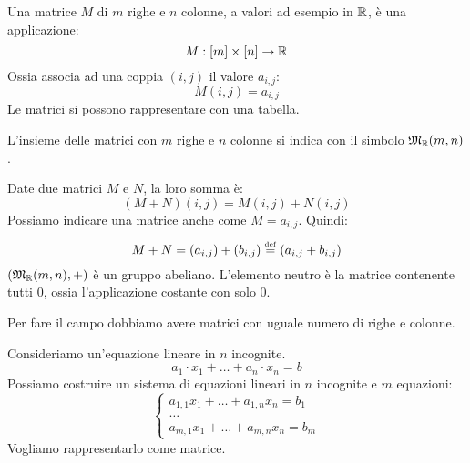 \begin{defn}
Una matrice $M$ di $m$ righe e $n$ colonne, a valori ad esempio in $\mathbb{R}$, \`e una applicazione:
\[
M : [m] \times [n] \to \mathbb{R}
\]
Ossia associa ad una coppia $(i, j)$ il valore $a_{i, j}$:
\[
M(i, j) = a_{i, j}
\]
Le matrici si possono rappresentare con una tabella.
\end{defn}

L'insieme delle matrici con $m$ righe e $n$ colonne si indica con il simbolo $\mathfrak{M}_{\mathbb{R}}(m,n)$.

Date due matrici $M$ e $N$, la loro somma \`e:
\[
(M + N) (i, j) = M(i, j) + N(i, j)
\]
Possiamo indicare una matrice anche come $M = a_{i, j}$. Quindi:
\[
M + N = (a_{i, j}) + (b_{i, j}) \overset{\underset{\mathrm{def}}{}}{=} (a_{i, j} + b_{i, j})
\]
$(\mathfrak{M}_{\mathbb{R}}(m,n), +)$ \`e un gruppo abeliano. L'elemento neutro \`e la matrice contenente tutti 0, ossia l'applicazione costante con solo 0.

Per fare il campo dobbiamo avere matrici con uguale numero di righe e colonne.

Consideriamo un'equazione lineare in $n$ incognite.
\[
a_1 \cdot x_1 + \dots + a_n \cdot x_n = b
\]
Possiamo costruire un sistema di equazioni lineari in $n$ incognite e $m$ equazioni:
\[
\begin{cases}
a_{1,1} x_1 + \dots + a_{1,n} x_n = b_1 \\
\dots \\
a_{m,1} x_1 + \dots + a_{m,n} x_n = b_m
\end{cases}
\]
Vogliamo rappresentarlo come matrice.

